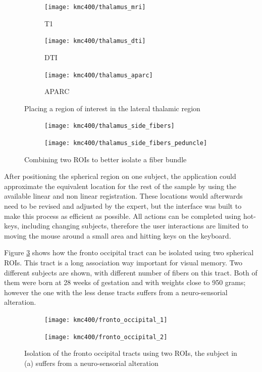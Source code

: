 \begin{figure}
\centering
	\begin{subfigure}{0.3\textwidth}
		\texttt{[image: kmc400/thalamus\_mri]}
		\caption{T1}
	\end{subfigure}
	\begin{subfigure}{0.3\textwidth}
\texttt{[image: kmc400/thalamus\_dti]}
		\caption{DTI}
	\end{subfigure}
	\begin{subfigure}{0.3\textwidth}
\texttt{[image: kmc400/thalamus\_aparc]}
		\caption{APARC}
	\end{subfigure}	
\caption{Placing a region of interest in the lateral thalamic region
\label{fig_thalamus_seed}}
\end{figure}



\begin{figure}
\centering
	\begin{subfigure}{0.45\textwidth}
		\texttt{[image: kmc400/thalamus\_side\_fibers]}
		\caption{}
	\end{subfigure}
	\begin{subfigure}{0.45\textwidth}
\texttt{[image: kmc400/thalamus\_side\_fibers\_peduncle]}
		\caption{}
	\end{subfigure}
\caption{Combining two ROIs to better isolate a fiber bundle
\label{fig_thalamus_fibers}}
\end{figure}

After positioning the spherical region on one subject, the application could approximate the equivalent location for the rest of the sample by using the available linear and non linear registration. These locations would afterwards need to be revised and adjusted by the expert, but the interface was built to make this process as efficient as possible. All actions can be completed using hot-keys, including changing subjects, therefore the user interactions are limited to moving the mouse around a small area and hitting keys on the keyboard.

Figure \ref{fig_fronto_occipital} shows how the fronto occipital tract can be isolated using two spherical ROIs. This tract is a long association way  important for visual memory. Two different subjects are shown, with different number of fibers on this tract. Both of them were born at 28 weeks of gestation and with weights close to 950 grams; however the one with the less dense tracts suffers from a neuro-sensorial alteration.

\begin{figure}
\centering
	\begin{subfigure}{0.45\textwidth}
		\texttt{[image: kmc400/fronto\_occipital\_1]}
		\caption{}
	\end{subfigure}
	\begin{subfigure}{0.45\textwidth}
\texttt{[image: kmc400/fronto\_occipital\_2]}
		\caption{}
	\end{subfigure}
\caption{Isolation of the fronto occipital tracts using two ROIs, the subject in (a) suffers from a neuro-sensorial alteration
\label{fig_fronto_occipital}}
\end{figure}



